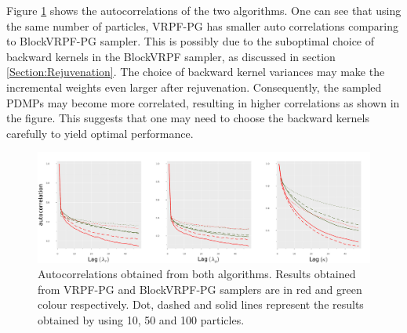\documentclass[12pt,a4paper]{article}
\begin{document}
Figure \ref{Figure: SNC-ACF} shows the autocorrelations of the two algorithms. One can see that using the same number of particles, VRPF-PG has smaller auto correlations comparing to BlockVRPF-PG sampler. This is possibly due to the suboptimal choice of backward kernels in the BlockVRPF sampler, as discussed in section \ref{Section:Rejuvenation}. The choice of backward kernel variances may make the incremental weights even larger after rejuvenation. Consequently, the sampled PDMPs may become more correlated, resulting in higher correlations as shown in the figure. This suggests that one may need to choose the backward kernels carefully to yield optimal performance. 
\begin{figure}[htb!]
    \centering
    \includegraphics[width=\textwidth]{SNC_ACF.pdf}
    \caption{Autocorrelations obtained from both algorithms. Results obtained from VRPF-PG and BlockVRPF-PG samplers are in red and green colour respectively. Dot, dashed and solid lines represent the results obtained by using 10, 50 and 100 particles.}
    \label{Figure: SNC-ACF}
\end{figure}
\end{document}
